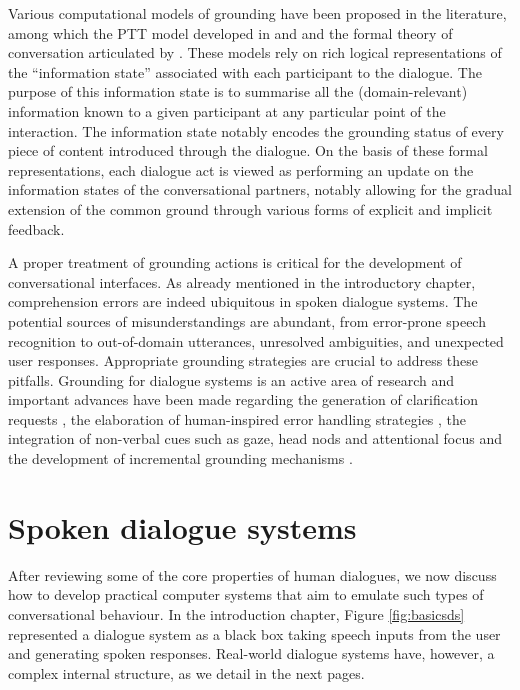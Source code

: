 Various computational models of grounding have been proposed in the literature, among which the PTT model developed in \cite{COIN:COIN042} and \cite{MathesonPT00} and the formal theory of conversation articulated by \cite{Ginzburg2012}.  These models rely on rich logical representations of the ``information state'' associated with each participant to the dialogue.  The purpose of this information state is to summarise all the (domain-relevant) information known to a given participant at any particular point of the interaction. The information state notably encodes the grounding status of every piece of content introduced through the dialogue. On the basis of these formal representations, each dialogue act is viewed as performing an update on the information states of the conversational partners, notably allowing for the gradual extension of the common ground through various forms of explicit and implicit feedback. 

A proper treatment of grounding actions is critical for the development of conversational interfaces.  As already mentioned in the introductory chapter, comprehension errors are indeed ubiquitous in spoken dialogue systems.  The potential sources of misunderstandings are abundant, from error-prone speech recognition to out-of-domain utterances, unresolved ambiguities, and unexpected user responses.  Appropriate grounding strategies are crucial to address these pitfalls. Grounding for dialogue systems is an active area of research and important advances have been made regarding the generation of clarification requests \citep{Purver04Thesis,Rieser:2005}, the elaboration of human-inspired error handling strategies \citep{Skantze2007}, the integration of non-verbal cues such as gaze, head nods and attentional focus \citep{Nakano:2003} and the development of incremental grounding mechanisms \citep{visser_toward_2012}. 

\section{Spoken dialogue systems}
\label{sec:sds}

After reviewing some of the core properties of human dialogues, we now discuss how to develop practical computer systems that aim to emulate such types of conversational behaviour.   In the introduction chapter, Figure \ref{fig:basicsds} represented a dialogue system as a black box taking speech inputs from the user and generating spoken responses.  Real-world dialogue systems have, however, a complex internal structure, as we detail in the next pages.

